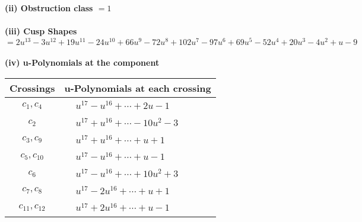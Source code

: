 \documentclass[1p]{elsarticle_modified}
\theoremstyle{definition}
\begin{document}
\flushleft \textbf{(ii) Obstruction class $= 1$}\\~\\
\flushleft \textbf{(iii) Cusp Shapes $= 2 u^{13}-3 u^{12}+19 u^{11}-24 u^{10}+66 u^9-72 u^8+102 u^7-97 u^6+69 u^5-52 u^4+20 u^3-4 u^2+u-9$}\\~\\
\newpage\renewcommand{\arraystretch}{1}
\flushleft \textbf{(iv) u-Polynomials at the component}\newline \\
\begin{tabular}{m{50pt}|m{274pt}}
Crossings & \hspace{64pt}u-Polynomials at each crossing \\
\hline $$\begin{aligned}c_{1},c_{4}\end{aligned}$$&$\begin{aligned}
&u^{17}- u^{16}+\cdots+2 u-1
\end{aligned}$\\
\hline $$\begin{aligned}c_{2}\end{aligned}$$&$\begin{aligned}
&u^{17}+u^{16}+\cdots-10 u^2-3
\end{aligned}$\\
\hline $$\begin{aligned}c_{3},c_{9}\end{aligned}$$&$\begin{aligned}
&u^{17}+u^{16}+\cdots+u+1
\end{aligned}$\\
\hline $$\begin{aligned}c_{5},c_{10}\end{aligned}$$&$\begin{aligned}
&u^{17}- u^{16}+\cdots+u-1
\end{aligned}$\\
\hline $$\begin{aligned}c_{6}\end{aligned}$$&$\begin{aligned}
&u^{17}- u^{16}+\cdots+10 u^2+3
\end{aligned}$\\
\hline $$\begin{aligned}c_{7},c_{8}\end{aligned}$$&$\begin{aligned}
&u^{17}-2 u^{16}+\cdots+u+1
\end{aligned}$\\
\hline $$\begin{aligned}c_{11},c_{12}\end{aligned}$$&$\begin{aligned}
&u^{17}+2 u^{16}+\cdots+u-1
\end{aligned}$\\
\hline
\end{tabular}\\~\\
\end{document}

